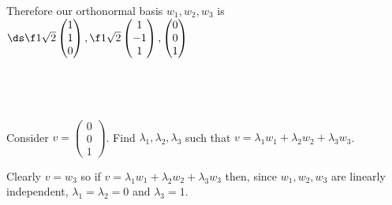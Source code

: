 \documentclass[a4paper]{article}
\begin{document}
Therefore our orthonormal basis $w_1, w_2, w_3$ is $\ds \f1{\sqrt2} \begin{pmatrix}1\\ 1\\ 0\end{pmatrix}, \f1{\sqrt2} \begin{pmatrix}1\\ -1\\ 1\end{pmatrix}, \begin{pmatrix}0\\ 0\\ 1\end{pmatrix}$

\subsection{~} %

\begin{questionbody}
Consider $v = \begin{pmatrix}0\\ 0\\ 1\end{pmatrix}$. Find $\lambda_1, \lambda_2, \lambda_3$ such that $v = \lambda_1 w_1 + \lambda_2 w_2 + \lambda_3 w_3$.
\end{questionbody}

Clearly $v = w_3$ so if $v = \lambda_1 w_1 + \lambda_2 w_2 + \lambda_3 w_3$ then, since $w_1, w_2, w_3$ are linearly independent, $\lambda_1 = \lambda_2 = 0$ and $\lambda_3 = 1$.


\end{document}
